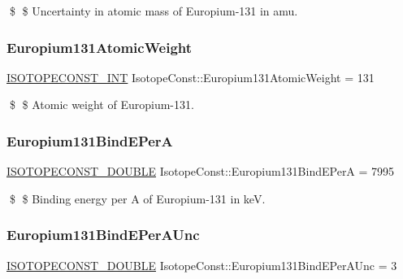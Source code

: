 \$ \$ Uncertainty in atomic mass of Europium-\/131 in amu. \mbox{\label{group___isotope_const-_europium-_eu131_ga5c5ec30ced44a41c1dda84784c7546c1}} 
\subsubsection{\texorpdfstring{Europium131\+Atomic\+Weight}{Europium131AtomicWeight}}
{\footnotesize\ttfamily \mbox{\hyperlink{group___isotope_const-_macros_ga5f18360b3e99483a35c32d789e62621c}{I\+S\+O\+T\+O\+P\+E\+C\+O\+N\+S\+T\+\_\+\+I\+NT}} Isotope\+Const\+::\+Europium131\+Atomic\+Weight = 131}

\$ \$ Atomic weight of Europium-\/131. \mbox{\label{group___isotope_const-_europium-_eu131_ga9b725254fc0526bef875edfd93da4682}} 
\subsubsection{\texorpdfstring{Europium131\+Bind\+E\+PerA}{Europium131BindEPerA}}
{\footnotesize\ttfamily \mbox{\hyperlink{group___isotope_const-_macros_ga8f45a7272ce02c0b4c65c44636ed719a}{I\+S\+O\+T\+O\+P\+E\+C\+O\+N\+S\+T\+\_\+\+D\+O\+U\+B\+LE}} Isotope\+Const\+::\+Europium131\+Bind\+E\+PerA = 7995}

\$ \$ Binding energy per A of Europium-\/131 in keV. \mbox{\label{group___isotope_const-_europium-_eu131_ga26c113c009aef2a8b762d3ef170b0cb5}} 
\subsubsection{\texorpdfstring{Europium131\+Bind\+E\+Per\+A\+Unc}{Europium131BindEPerAUnc}}
{\footnotesize\ttfamily \mbox{\hyperlink{group___isotope_const-_macros_ga8f45a7272ce02c0b4c65c44636ed719a}{I\+S\+O\+T\+O\+P\+E\+C\+O\+N\+S\+T\+\_\+\+D\+O\+U\+B\+LE}} Isotope\+Const\+::\+Europium131\+Bind\+E\+Per\+A\+Unc = 3}

